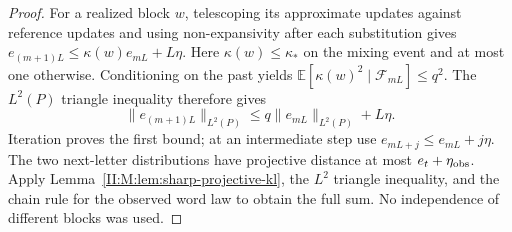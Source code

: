 \begin{proof}
For a realized block $w$, telescoping its approximate updates against
reference updates and using non-expansivity after each substitution
gives $e_{(m+1)L}\le\kappa(w)e_{mL}+L\eta$.
Here $\kappa(w)\le\kappa_*$ on the mixing event and at most one
otherwise. Conditioning on the past yields
$\mathbb E[\kappa(w)^2\mid\mathcal F_{mL}]\le q^2$.
The $L^2(P)$ triangle inequality therefore gives
\[
 \|e_{(m+1)L}\|_{L^2(P)}
 \le q\|e_{mL}\|_{L^2(P)}+L\eta.
\]
Iteration proves the first bound; at an intermediate step use
$e_{mL+j}\le e_{mL}+j\eta$. The two next-letter distributions have
projective distance at most $e_t+\eta_{\rm obs}$. Apply
Lemma~\ref{II:M:lem:sharp-projective-kl}, the $L^2$ triangle inequality,
and the chain rule for the observed word law to obtain the full sum.
No independence of different blocks was used.
\end{proof}
